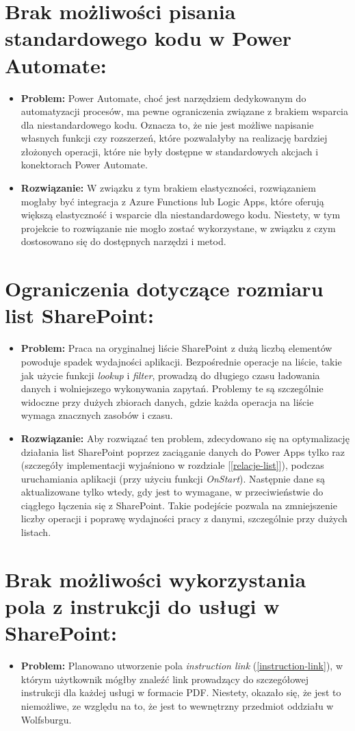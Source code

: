 \section*{Brak możliwości pisania standardowego kodu w Power Automate:}
\begin{itemize}
      \item \textbf{Problem:} Power Automate, choć jest narzędziem dedykowanym do automatyzacji procesów, ma pewne ograniczenia związane z brakiem wsparcia dla niestandardowego kodu. Oznacza to, że nie jest możliwe napisanie własnych funkcji czy rozszerzeń, które pozwalałyby na realizację bardziej złożonych operacji, które nie były dostępne w standardowych akcjach i konektorach Power Automate.
      \item \textbf{Rozwiązanie:} W związku z tym brakiem elastyczności, rozwiązaniem mogłaby być integracja z Azure Functions lub Logic Apps, które oferują większą elastyczność i wsparcie dla niestandardowego kodu. Niestety, w tym projekcie to rozwiązanie nie mogło zostać wykorzystane, w związku z czym dostosowano się do dostępnych narzędzi i metod.
\end{itemize}

\section*{Ograniczenia dotyczące rozmiaru list SharePoint:}
\begin{itemize}
      \item \textbf{Problem:} Praca na oryginalnej liście SharePoint z dużą liczbą elementów powoduje spadek wydajności aplikacji. Bezpośrednie operacje na liście, takie jak użycie funkcji \emph{lookup} i \emph{filter}, prowadzą do długiego czasu ładowania danych i wolniejszego wykonywania zapytań. Problemy te są szczególnie widoczne przy dużych zbiorach danych, gdzie każda operacja na liście wymaga znacznych zasobów i czasu.
      \item \textbf{Rozwiązanie:} Aby rozwiązać ten problem, zdecydowano się na optymalizację działania list SharePoint poprzez zaciąganie danych do Power Apps tylko raz (szczegóły implementacji wyjaśniono w rozdziale [\ref{relacje-list}]), podczas uruchamiania aplikacji (przy użyciu funkcji \emph{OnStart}). Następnie dane są aktualizowane tylko wtedy, gdy jest to wymagane, w przeciwieństwie do ciągłego łączenia się z SharePoint. Takie podejście pozwala na zmniejszenie liczby operacji i poprawę wydajności pracy z danymi, szczególnie przy dużych listach.
\end{itemize}
\section*{Brak możliwości wykorzystania pola z instrukcji do usługi w SharePoint:}
\begin{itemize}
      \item \textbf{Problem:} Planowano utworzenie pola \emph{instruction link} (\ref{instruction-link}), w którym użytkownik mógłby znaleźć link prowadzący do szczegółowej instrukcji dla każdej usługi w formacie PDF. Niestety, okazało się, że jest to niemożliwe, ze względu na to, że jest to wewnętrzny przedmiot oddziału w Wolfsburgu.
\end{itemize}

